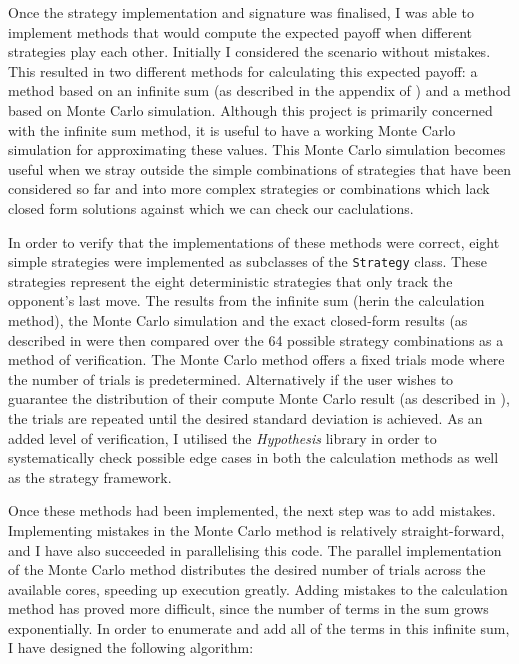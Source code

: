 \documentclass[a4paper,11pt]{article}
\begin{document}
Once the strategy implementation and signature was finalised, I was able to implement methods that would compute the expected payoff when different strategies play each other.
Initially I considered the scenario without mistakes.
This resulted in two different methods for calculating this expected payoff: a method based on an infinite sum (as described in the appendix of \cite{garciaandtraulsen}) and a method based on Monte Carlo simulation.
Although this project is primarily concerned with the infinite sum method, it is useful to have a working Monte Carlo simulation for approximating these values.
This Monte Carlo simulation becomes useful when we stray outside the simple combinations of strategies that have been considered so far and into more complex strategies or combinations which lack closed form solutions against which we can check our caclulations.

In order to verify that the implementations of these methods were correct, eight simple strategies were implemented as subclasses of the \texttt{Strategy} class.
These strategies represent the eight deterministic strategies that only track the opponent's last move.
The results from the infinite sum (herin the calculation method), the Monte Carlo simulation and the exact closed-form results (as described in \cite{garciaandtraulsen} were then compared over the 64 possible strategy combinations as a method of verification.
The Monte Carlo method offers a fixed trials mode where the number of trials is predetermined.
Alternatively if the user wishes to guarantee the distribution of their compute Monte Carlo result (as described in \cite{ross}), the trials are repeated until the desired standard deviation is achieved.
As an added level of verification, I utilised the {\em Hypothesis} \cite{hypothesis} library in order to systematically check possible edge cases in both the calculation methods as well as the strategy framework.

Once these methods had been implemented, the next step was to add mistakes.
Implementing mistakes in the Monte Carlo method is relatively straight-forward, and I have also succeeded in parallelising this code.
The parallel implementation of the Monte Carlo method distributes the desired number of trials across the available cores, speeding up execution greatly.
Adding mistakes to the calculation method has proved more difficult, since the number of terms in the sum grows exponentially.
In order to enumerate and add all of the terms in this infinite sum, I have designed the following algorithm:
\end{document}
